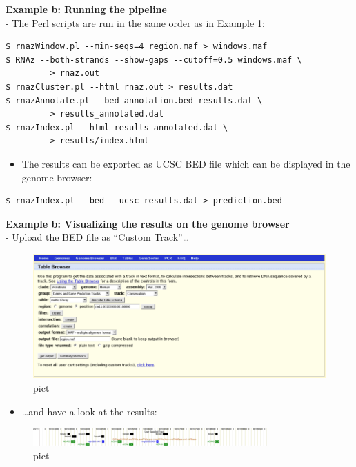 \documentclass[]{article}
\providecommand{\tightlist}{%
  \setlength{\itemsep}{0pt}\setlength{\parskip}{0pt}}
\begin{document}
\textbf{Example b: Running the pipeline}\\
- The Perl scripts are run in the same order as in Example 1:

\begin{verbatim}
$ rnazWindow.pl --min-seqs=4 region.maf > windows.maf
$ RNAz --both-strands --show-gaps --cutoff=0.5 windows.maf \
         > rnaz.out
$ rnazCluster.pl --html rnaz.out > results.dat
$ rnazAnnotate.pl --bed annotation.bed results.dat \
         > results_annotated.dat
$ rnazIndex.pl --html results_annotated.dat \
         > results/index.html
\end{verbatim}

\begin{itemize}
\tightlist
\item
  The results can be exported as UCSC BED file which can be displayed in
  the genome browser:
\end{itemize}

\begin{verbatim}
$ rnazIndex.pl --bed --ucsc results.dat > prediction.bed
\end{verbatim}

\textbf{Example b: Visualizing the results on the genome browser}\\
- Upload the BED file as ``Custom Track''\ldots{}

\begin{figure}[htbp]
\centering
\includegraphics{Figs/table-browser.png}
\caption{pict}
\end{figure}

\begin{itemize}
\tightlist
\item
  \ldots{}and have a look at the results:
\end{itemize}

\begin{figure}[htbp]
\centering
\includegraphics{Figs/snos.png}
\caption{pict}
\end{figure}
\end{document}
